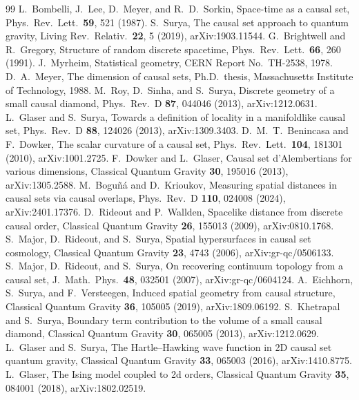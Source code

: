 \documentclass[prd,twocolumn,superscriptaddress,nofootinbib,amsmath,amssymb,floatfix]{revtex4-2}
\begin{document}
\begin{thebibliography}{99}
 L.~Bombelli, J.~Lee, D.~Meyer, and R.~D.~Sorkin, Space-time as a causal set, Phys.\ Rev.\ Lett.\ \textbf{59}, 521 (1987).
 S.~Surya, The causal set approach to quantum gravity, Living Rev.\ Relativ.\ \textbf{22}, 5 (2019), arXiv:1903.11544.
 G.~Brightwell and R.~Gregory, Structure of random discrete spacetime, Phys.\ Rev.\ Lett.\ \textbf{66}, 260 (1991).
 J.~Myrheim, Statistical geometry, CERN Report No.\ TH-2538, 1978.
 D.~A.~Meyer, The dimension of causal sets, Ph.D.\ thesis, Massachusetts Institute of Technology, 1988.
 M.~Roy, D.~Sinha, and S.~Surya, Discrete geometry of a small causal diamond, Phys.\ Rev.\ D \textbf{87}, 044046 (2013), arXiv:1212.0631.
 L.~Glaser and S.~Surya, Towards a definition of locality in a manifoldlike causal set, Phys.\ Rev.\ D \textbf{88}, 124026 (2013), arXiv:1309.3403.
 D.~M.~T.~Benincasa and F.~Dowker, The scalar curvature of a causal set, Phys.\ Rev.\ Lett.\ \textbf{104}, 181301 (2010), arXiv:1001.2725.
 F.~Dowker and L.~Glaser, Causal set d'Alembertians for various dimensions, Classical Quantum Gravity \textbf{30}, 195016 (2013), arXiv:1305.2588.
 M.~Bogu\~n\'a and D.~Krioukov, Measuring spatial distances in causal sets via causal overlaps, Phys.\ Rev.\ D \textbf{110}, 024008 (2024), arXiv:2401.17376.
 D.~Rideout and P.~Wallden, Spacelike distance from discrete causal order, Classical Quantum Gravity \textbf{26}, 155013 (2009), arXiv:0810.1768.
 S.~Major, D.~Rideout, and S.~Surya, Spatial hypersurfaces in causal set cosmology, Classical Quantum Gravity \textbf{23}, 4743 (2006), arXiv:gr-qc/0506133.
 S.~Major, D.~Rideout, and S.~Surya, On recovering continuum topology from a causal set, J.\ Math.\ Phys.\ \textbf{48}, 032501 (2007), arXiv:gr-qc/0604124.
 A.~Eichhorn, S.~Surya, and F.~Versteegen, Induced spatial geometry from causal structure, Classical Quantum Gravity \textbf{36}, 105005 (2019), arXiv:1809.06192.
 S.~Khetrapal and S.~Surya, Boundary term contribution to the volume of a small causal diamond, Classical Quantum Gravity \textbf{30}, 065005 (2013), arXiv:1212.0629.
 L.~Glaser and S.~Surya, The Hartle--Hawking wave function in 2D causal set quantum gravity, Classical Quantum Gravity \textbf{33}, 065003 (2016), arXiv:1410.8775.
 L.~Glaser, The Ising model coupled to 2d orders, Classical Quantum Gravity \textbf{35}, 084001 (2018), arXiv:1802.02519.

\end{thebibliography}
\end{document}

